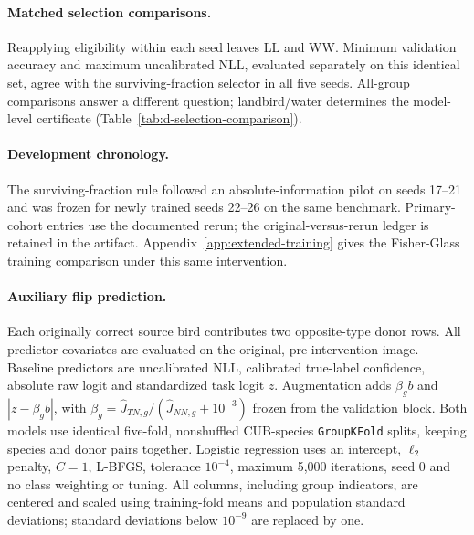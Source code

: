 \paragraph{Matched selection comparisons.}
Reapplying eligibility within each seed leaves LL and WW. Minimum validation accuracy and maximum uncalibrated NLL, evaluated separately on this identical set, agree with the surviving-fraction selector in all five seeds. All-group comparisons answer a different question; landbird/water determines the model-level certificate (Table~\ref{tab:d-selection-comparison}).


\paragraph{Development chronology.}
The surviving-fraction rule followed an absolute-information pilot on seeds 17--21 and was frozen for newly trained seeds 22--26 on the same benchmark. Primary-cohort entries use the documented rerun; the original-versus-rerun ledger is retained in the artifact. Appendix~\ref{app:extended-training} gives the Fisher-Glass training comparison under this same intervention.



\paragraph{Auxiliary flip prediction.}
Each originally correct source bird contributes two opposite-type donor rows. All predictor covariates are evaluated on the original, pre-intervention image. Baseline predictors are uncalibrated NLL, calibrated true-label confidence, absolute raw logit and standardized task logit $z$. Augmentation adds $\beta_gb$ and $|z-\beta_gb|$, with $\beta_g=\widehat J_{TN,g}/(\widehat J_{NN,g}+10^{-3})$ frozen from the validation block. Both models use identical five-fold, nonshuffled CUB-species \texttt{GroupKFold} splits, keeping species and donor pairs together. Logistic regression uses an intercept, $\ell_2$ penalty, $C=1$, L-BFGS, tolerance $10^{-4}$, maximum 5,000 iterations, seed 0 and no class weighting or tuning. All columns, including group indicators, are centered and scaled using training-fold means and population standard deviations; standard deviations below $10^{-9}$ are replaced by one.

